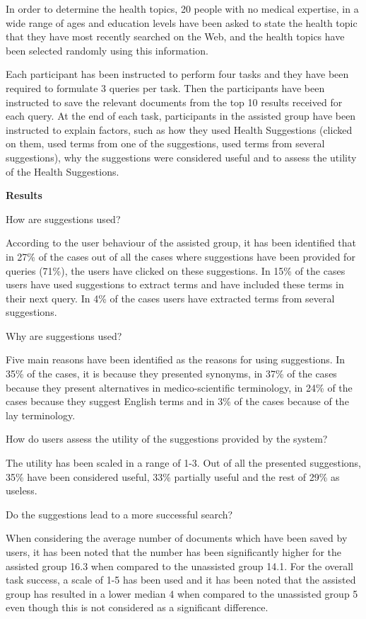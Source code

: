 \documentclass[]{article}
\begin{document}
In order to determine the health topics, 20 people with no medical expertise, in a wide range of ages and education levels have been asked to state the health topic that they have most recently searched on the Web, and the health topics have been selected randomly using this information.

Each participant has been instructed to perform four tasks and they have been required to formulate 3 queries per task. Then the participants have been instructed to save the relevant documents from the top 10 results received for each query. At the end of each task, participants in the assisted group have been instructed to explain factors, such as how they used Health Suggestions (clicked on them, used terms from one of the suggestions, used terms from several suggestions), why the suggestions were considered useful and to assess the utility of the Health Suggestions.        

\textbf{Results}

How are suggestions used?
 
According to the user behaviour of the assisted group, it has been identified that in 27\% of the cases out of all the cases where suggestions have been provided for queries (71\%), the users have clicked on these suggestions. In 15\% of the cases users have used suggestions to extract terms and have included these terms in their next query. In 4\% of the cases users have extracted terms from several suggestions.
     
Why are suggestions used?

Five main reasons have been identified as the reasons for using suggestions. In 35\% of the cases, it is because they presented synonyms, in 37\% of the cases because they present alternatives in medico-scientific terminology, in 24\% of the cases because they suggest English terms and in 3\% of the cases because of the lay terminology. 

How do users assess the utility of the suggestions provided by the system? 

The utility has been scaled in a range of 1-3. Out of all the presented suggestions, 35\% have been considered useful, 33\% partially useful and the rest of 29\% as useless. 

Do the suggestions lead to a more successful search?

When considering the average number of documents which have been saved by users, it has been noted that the number has been significantly higher for the assisted group 16.3 when compared to the unassisted group 14.1. For the overall task success, a scale of 1-5 has been used and it has been noted that the assisted group has resulted in a lower median 4 when compared to the unassisted group 5 even though this is not considered as a significant difference.     
\end{document}
